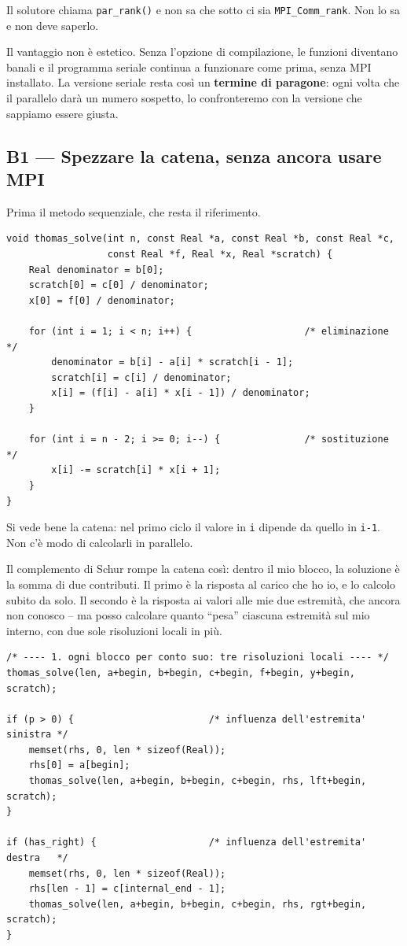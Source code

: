 \documentclass[11pt,a4paper]{article}
\newcommand{\cd}[1]{\texttt{\small #1}}
\begin{document}
Il solutore chiama \cd{par\_rank()} e non sa che sotto ci sia
\cd{MPI\_Comm\_rank}. Non lo sa e non deve saperlo.

Il vantaggio non è estetico. Senza l'opzione di compilazione, le funzioni
diventano banali e il programma seriale continua a funzionare come prima, senza
MPI installato. La versione seriale resta così un \textbf{termine di paragone}:
ogni volta che il parallelo darà un numero sospetto, lo confronteremo con la
versione che sappiamo essere giusta.

\subsection*{B1 --- Spezzare la catena, senza ancora usare MPI}

Prima il metodo sequenziale, che resta il riferimento.

\begin{lstlisting}
void thomas_solve(int n, const Real *a, const Real *b, const Real *c,
                  const Real *f, Real *x, Real *scratch) {
    Real denominator = b[0];
    scratch[0] = c[0] / denominator;
    x[0] = f[0] / denominator;

    for (int i = 1; i < n; i++) {                    /* eliminazione */
        denominator = b[i] - a[i] * scratch[i - 1];
        scratch[i] = c[i] / denominator;
        x[i] = (f[i] - a[i] * x[i - 1]) / denominator;
    }

    for (int i = n - 2; i >= 0; i--) {               /* sostituzione */
        x[i] -= scratch[i] * x[i + 1];
    }
}
\end{lstlisting}

Si vede bene la catena: nel primo ciclo il valore in \cd{i} dipende da quello in
\cd{i-1}. Non c'è modo di calcolarli in parallelo.

\medskip
Il complemento di Schur rompe la catena così: dentro il mio blocco, la soluzione
è la somma di due contributi. Il primo è la risposta al carico che ho io, e lo
calcolo subito da solo. Il secondo è la risposta ai valori alle mie due
estremità, che ancora non conosco -- ma posso calcolare quanto ``pesa'' ciascuna
estremità sul mio interno, con due sole risoluzioni locali in più.

\begin{lstlisting}
/* ---- 1. ogni blocco per conto suo: tre risoluzioni locali ---- */
thomas_solve(len, a+begin, b+begin, c+begin, f+begin, y+begin, scratch);

if (p > 0) {                        /* influenza dell'estremita' sinistra */
    memset(rhs, 0, len * sizeof(Real));
    rhs[0] = a[begin];
    thomas_solve(len, a+begin, b+begin, c+begin, rhs, lft+begin, scratch);
}

if (has_right) {                    /* influenza dell'estremita' destra   */
    memset(rhs, 0, len * sizeof(Real));
    rhs[len - 1] = c[internal_end - 1];
    thomas_solve(len, a+begin, b+begin, c+begin, rhs, rgt+begin, scratch);
}
\end{lstlisting}
\end{document}

